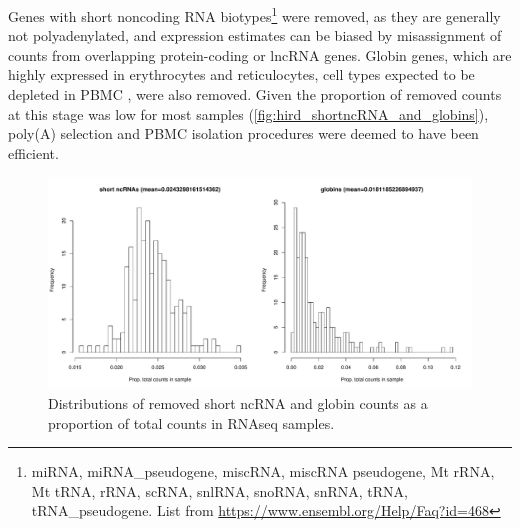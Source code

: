 Genes with short noncoding RNA biotypes\footnote{miRNA, miRNA\_pseudogene, miscRNA, miscRNA pseudogene, Mt rRNA, Mt tRNA, rRNA, scRNA, snlRNA, snoRNA, snRNA, tRNA, tRNA\_pseudogene. List from \url{https://www.ensembl.org/Help/Faq?id=468}} were removed, as they are generally not polyadenylated, and expression estimates can be biased by misassignment of counts from overlapping protein-coding or lncRNA genes\autocite{zhao2018EvaluationTwoMain}.
Globin genes, which are highly expressed in erythrocytes and reticulocytes, cell types expected to be depleted in \gls{PBMC} \autocite{min2010VariabilityGeneExpression}, were also removed.
Given the proportion of removed counts at this stage was low for most samples (\autoref{fig:hird_shortncRNA_and_globins}), poly(A) selection and \gls{PBMC} isolation procedures were deemed to have been efficient.



\begin{figure}
    \centering
    \includegraphics[width=1.0\textwidth, page=1]{mainmatter/figures/chapter_02/rnaseq_data_setup.per_sample.short_ncRNA_globin_levels_hist.pdf}
    \caption{Distributions of removed short ncRNA and globin counts as a proportion of total counts in \gls{RNAseq} samples.}
    \label{fig:hird_shortncRNA_and_globins}
\end{figure}

